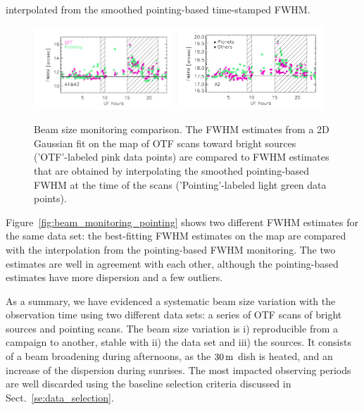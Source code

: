 interpolated from the smoothed pointing-based time-stamped FWHM.
%
\begin{figure}[ht!]
  \begin{center}
    \includegraphics[clip=true, trim={0.9cm, 0.5cm, 0.5cm, 0.5cm}, width=0.4725\textwidth]{Figures/Beams/Beam_monitoring_with_otfs_vs_ut_compare_pointings_1mm.pdf}
    \includegraphics[clip=true, trim={0.5cm, 0.5cm, 0.5cm, 0.5cm}, width=0.4875\textwidth]{Figures/Beams/Beam_monitoring_with_otfs_vs_ut_compare_pointings_a2.pdf}
    \caption[Beam size monitoring comparison]{Beam size monitoring
      comparison. The FWHM estimates from a 2D Gaussian fit on the map
      of OTF scans toward bright sources ('OTF'-labeled pink data
      points) are compared to FWHM estimates that are obtained by
      interpolating the smoothed pointing-based FWHM at the time of
      the scans ('Pointing'-labeled light green data points).}
\label{fig:beam_monitoring_compare}
\end{center}
\end{figure}
%
Figure~\ref{fig:beam_monitoring_pointing} shows two different FWHM
estimates for the same data set: the best-fitting FWHM estimates on
the map are compared with the interpolation from the pointing-based
FWHM monitoring. The two estimates are well in agreement with each
other, although the pointing-based estimates have more dispersion and
a few outliers.

As a summary, we have evidenced a systematic beam size variation with
the observation time using two different data sets: a series of OTF
scans of bright sources and pointing scans. The beam size
variation is i) reproducible from a campaign to another, stable
with ii) the data set and iii) the sources. It consists of a beam
broadening during afternoons, as the $30\,\rm{m}$ dish is heated, and
an increase of the dispersion during sunrises. The most impacted
observing periods are well discarded using the baseline selection
criteria discussed in Sect.~\ref{se:data_selection}.





